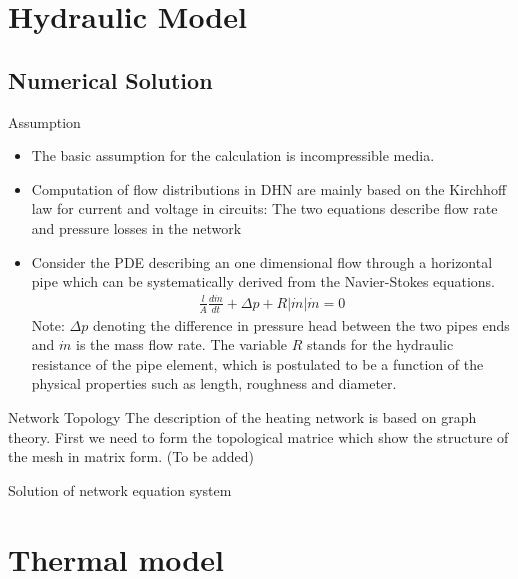\documentclass[xcolor=dvipsnames]{beamer}
\begin{document}
{\section{Hydraulic Model}

\subsection{Numerical Solution}
\begin{frame}{Assumption}

\begin{itemize}
	\item 	The basic assumption for the calculation is incompressible media.
	\item 	Computation of flow distributions in DHN are mainly based on the Kirchhoff law for {\color{red}current} and {\color{blue}voltage} in circuits: The two equations describe {\color{red}flow rate} and {\color{blue}pressure losses} in the network
	\item 	Consider the PDE describing an one dimensional flow through a horizontal pipe which can be systematically derived from the Navier-Stokes equations.
\begin{align}
	\frac{l}{A}\frac{d\dot{m}}{dt}+\Delta p+R|\dot{m}|\dot{m}=0
\end{align}
Note: $\Delta p$ denoting the difference in pressure head between the two pipes ends and $\dot{m}$ is the mass flow rate. The variable $R$ stands for the hydraulic resistance of the pipe element, which is postulated to be a function of the physical properties such as length, roughness and diameter.
\end{itemize}
\end{frame}

\begin{frame}{Network Topology}
The description of the heating network is based on graph theory. First we need to form the topological matrice which show the structure of the mesh in matrix form. (To be added)


\end{frame}

\begin{frame}{Solution of network equation system}

\end{frame}
}

\section{Thermal model}
\end{document}
